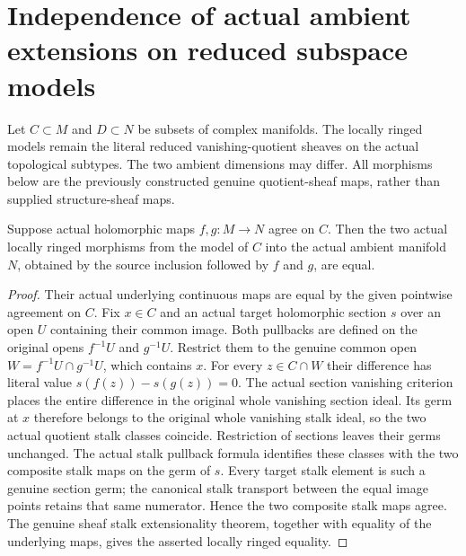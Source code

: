 \section{Independence of actual ambient extensions on reduced subspace models}
\label{sec:hironaka-actual-analytic-subspace-presentation-independence}

Let $C\subset M$ and $D\subset N$ be subsets of complex manifolds. The
locally ringed models remain the literal reduced vanishing-quotient sheaves
on the actual topological subtypes. The two ambient dimensions may differ.
All morphisms below are the previously constructed genuine quotient-sheaf
maps, rather than supplied structure-sheaf maps.

\begin{theorem}
\label{hir:actual-analytic-subspace-ambient-eqOn}
\leanok
Suppose actual holomorphic maps $f,g:M\to N$ agree on $C$. Then the two
actual locally ringed morphisms from the model of $C$ into the actual
ambient manifold $N$, obtained by the source inclusion followed by $f$
and $g$, are equal.
\end{theorem}
\begin{proof}
Their actual underlying continuous maps are equal by the given pointwise
agreement on $C$. Fix $x\in C$ and an actual target holomorphic section
$s$ over an open $U$ containing their common image. Both pullbacks are
defined on the original opens $f^{-1}U$ and $g^{-1}U$. Restrict them to
the genuine common open $W=f^{-1}U\cap g^{-1}U$, which contains $x$.
For every $z\in C\cap W$ their difference has literal value
$s(f(z))-s(g(z))=0$. The actual section vanishing criterion places the
entire difference in the original whole vanishing section ideal. Its
germ at $x$ therefore belongs to the original whole vanishing stalk
ideal, so the two actual quotient stalk classes coincide. Restriction
of sections leaves their germs unchanged. The actual stalk pullback
formula identifies these classes with the two composite stalk maps on
the germ of $s$. Every target stalk element is such a genuine section
germ; the canonical stalk transport between the equal image points
retains that same numerator. Hence the two composite stalk maps agree.
The genuine sheaf stalk extensionality theorem, together with equality
of the underlying maps, gives the asserted locally ringed equality.
\end{proof}

